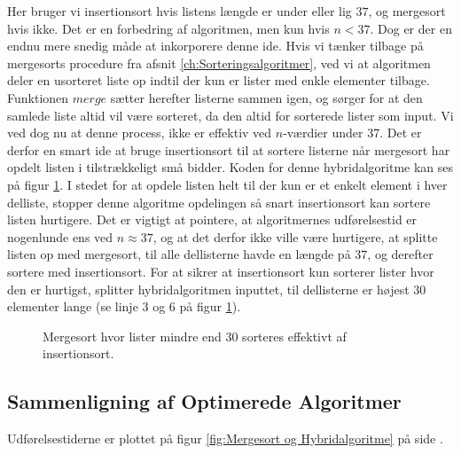 Her bruger vi insertionsort hvis listens længde er under eller lig $37$, og mergesort hvis ikke. Det er en forbedring af algoritmen, men kun hvis $n < 37$. Dog er der en endnu mere snedig måde at inkorporere denne ide. Hvis vi tænker tilbage på mergesorts procedure fra afsnit \ref{ch:Sorteringsalgoritmer}, ved vi at algoritmen deler en usorteret liste op indtil der kun er lister med enkle elementer tilbage. Funktionen $merge$ sætter herefter listerne sammen igen, og sørger for at den samlede liste altid vil være sorteret, da den altid for sorterede lister som input. Vi ved dog nu at denne process, ikke er effektiv ved $n$-værdier under 37. Det er derfor en smart ide at bruge insertionsort til at sortere listerne når mergesort har opdelt listen i tilstrækkeligt små bidder. Koden for denne hybridalgoritme kan ses på figur \ref{fig:hybridalgoritme i Python}. I stedet for at opdele listen helt til der kun er et enkelt element i hver delliste, stopper denne algoritme opdelingen så snart insertionsort kan sortere listen hurtigere. Det er vigtigt at pointere, at algoritmernes udførelsestid er nogenlunde ens ved $n \approx 37$, og at det derfor ikke ville være hurtigere, at splitte listen op med mergesort, til alle dellisterne havde en længde på $37$, og derefter sortere med insertionsort. For at sikrer at insertionsort kun sorterer lister hvor den er hurtigst, splitter hybridalgoritmen inputtet, til dellisterne er højest $30$ elementer lange (se linje 3 og 6 på figur \ref{fig:hybridalgoritme i Python}).



\begin{figure}
	\begin{center}
		
	\end{center}
	\caption{Mergesort hvor lister mindre end 30 sorteres effektivt af insertionsort.}
	\label{fig:hybridalgoritme i Python}
\end{figure}




\subsection{Sammenligning af Optimerede Algoritmer}%
\label{sub:Sammenligning af Optimerede Algoritmer}

Udførelsestiderne er plottet på figur \ref{fig:Mergesort og Hybridalgoritme} på side \pageref{fig:Mergesort og Hybridalgoritme}.\\

